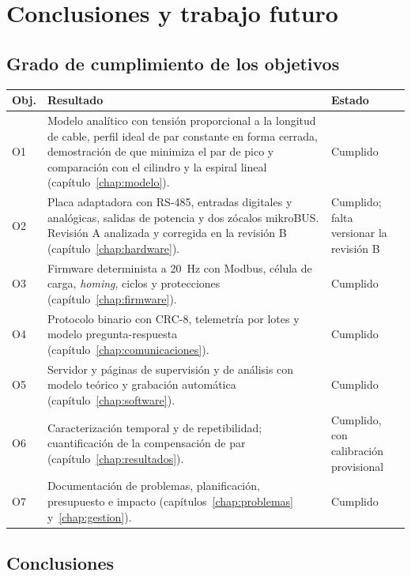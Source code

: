 \chapter{Conclusiones y trabajo futuro}
\label{chap:conclusiones}

\section{Grado de cumplimiento de los objetivos}

\begin{longtable}{@{}L{0.07\textwidth}L{0.58\textwidth}L{0.23\textwidth}@{}}
\toprule
\textbf{Obj.} & \textbf{Resultado} & \textbf{Estado} \\
\midrule
\endhead
O1 & Modelo analítico con tensión proporcional a la longitud de cable, perfil ideal de par constante en forma cerrada, demostración de que minimiza el par de pico y comparación con el cilindro y la espiral lineal (capítulo~\ref{chap:modelo}). & Cumplido \\
O2 & Placa adaptadora con RS-485, entradas digitales y analógicas, salidas de potencia y dos zócalos mikroBUS. Revisión A analizada y corregida en la revisión B (capítulo~\ref{chap:hardware}). & Cumplido; falta versionar la revisión B \\
O3 & Firmware determinista a \SI{20}{\hertz} con Modbus, célula de carga, \emph{homing}, ciclos y protecciones (capítulo~\ref{chap:firmware}). & Cumplido \\
O4 & Protocolo binario con CRC-8, telemetría por lotes y modelo pregunta-respuesta (capítulo~\ref{chap:comunicaciones}). & Cumplido \\
O5 & Servidor y páginas de supervisión y de análisis con modelo teórico y grabación automática (capítulo~\ref{chap:software}). & Cumplido \\
O6 & Caracterización temporal y de repetibilidad; cuantificación de la compensación de par (capítulo~\ref{chap:resultados}). & Cumplido, con calibración provisional \\
O7 & Documentación de problemas, planificación, presupuesto e impacto (capítulos~\ref{chap:problemas} y~\ref{chap:gestion}). & Cumplido \\
\bottomrule
\end{longtable}

\section{Conclusiones}

